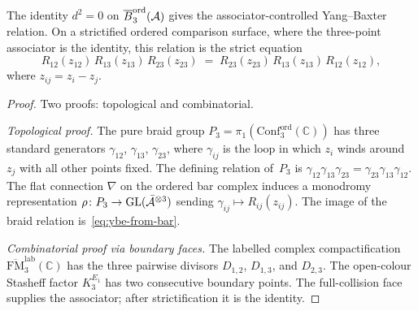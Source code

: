 \begin{proposition}[Yang--Baxter from $d^2=0$ on degree~$3$;
\ClaimStatusProvedHere]
\label{prop:ybe-from-d-squared}
The identity $d^2=0$ on $\overline{B}^{\mathrm{ord}}_3(\mathcal{A})$ gives the
associator-controlled Yang--Baxter relation. On a strictified
ordered comparison surface, where the three-point associator is the
identity, this relation is the strict equation
\begin{equation}\label{eq:ybe-from-bar}
R_{12}(z_{12})\,R_{13}(z_{13})\,R_{23}(z_{23})
\;=\;
R_{23}(z_{23})\,R_{13}(z_{13})\,R_{12}(z_{12}),
\end{equation}
where $z_{ij}=z_i-z_j$.
\end{proposition}

\begin{proof}
Two proofs: topological and combinatorial.

\emph{Topological proof.}
The pure braid group
$P_3=\pi_1(\mathrm{Conf}_3^{\mathrm{ord}}(\mathbb C))$
has three standard generators
$\gamma_{12}$, $\gamma_{13}$, $\gamma_{23}$, where
$\gamma_{ij}$ is the loop in which $z_i$ winds around $z_j$
with all other points fixed.
The defining relation of~$P_3$ is
$\gamma_{12}\gamma_{13}\gamma_{23}
=\gamma_{23}\gamma_{13}\gamma_{12}$.
The flat connection $\nabla$ on the ordered bar complex
induces a monodromy representation
$\rho\colon P_3\to\operatorname{GL}(\bar{\mathcal{A}}^{\otimes 3})$
sending $\gamma_{ij}\mapsto R_{ij}(z_{ij})$. The image
of the braid relation is~\eqref{eq:ybe-from-bar}.

\emph{Combinatorial proof via boundary faces.}
The labelled complex compactification
$\overline{\mathrm{FM}}_3^{\mathrm{lab}}(\mathbb C)$ has the three
pairwise divisors $D_{1,2}$, $D_{1,3}$, and $D_{2,3}$. The open-colour
Stasheff factor $K_3^{E_1}$ has two consecutive boundary points.
The full-collision face supplies the associator; after strictification
it is the identity.


\end{proof}
